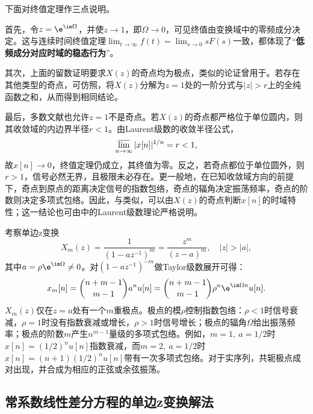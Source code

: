 下面对终值定理作三点说明。

首先，令$z=\e^{\im\Omega}$，并使$z\to 1$，即$\Omega\to 0$，可见终值由变换域中的零频成分决定。这与连续时间终值定理$\lim_{t\to\infty}f(t)=\lim_{s\to 0}sF(s)$一致，都体现了“\textbf{低频成分对应时域的稳态行为}”。

其次，上面的留数证明要求$X(z)$的奇点均为极点，类似的论证曾用于。若存在其他类型的奇点，可仿照，将$X(z)$分解为$z=1$处的一阶分式与$|z|>r$上的全纯函数之和，从而得到相同结论。

最后，多数文献也允许$z=1$不是奇点。若$X(z)$的奇点都严格位于单位圆内，则其收敛域的内边界半径$r<1$。由Laurent级数的收敛半径公式，
\begin{equation}
    \varlimsup_{n\to\infty}|x[n]|^{1/n}=r<1,
\end{equation}
故$x[n]\to 0$，终值定理仍成立，其终值为零。反之，若奇点都位于单位圆外，则$r>1$，信号必然无界，且极限未必存在。更一般地，在已知收敛域方向的前提下，奇点到原点的距离决定信号的指数包络，奇点的辐角决定振荡频率，奇点的阶数则决定多项式包络。因此，与类似，可以由$X(z)$的奇点判断$x[n]$的时域特性；这一结论也可由中的Laurent级数理论严格说明。

\begin{example}
    考察单边z变换
    \begin{equation}
        X_m(z)=\frac{1}{(1-az^{-1})^m}=\frac{z^m}{(z-a)^m},\quad |z|>|a|,
    \end{equation}
    其中$a=\rho\e^{\im\Omega}\neq 0$。对$(1-az^{-1})^{-m}$做Taylor级数展开可得：
    \begin{equation}
        x_m[n]=\binom{n+m-1}{m-1}a^n u[n]=\binom{n+m-1}{m-1}\rho^n\e^{\im\Omega n}u[n].
    \end{equation}
    $X_m(z)$仅在$z=a$处有一个$m$重极点。极点的模$\rho$控制指数包络：$\rho<1$时信号衰减，$\rho=1$时没有指数衰减或增长，$\rho>1$时信号增长；极点的辐角$\Omega$给出振荡频率；极点的阶数$m$产生$n^{m-1}$量级的多项式包络。例如，$m=1,\ a=1/2$时$x[n]=(1/2)^n u[n]$指数衰减，而$m=2,\ a=1/2$时$x[n]=(n+1)(1/2)^n u[n]$带有一次多项式包络。对于实序列，共轭极点成对出现，并合成为相应的正弦或余弦振荡。
\end{example}

\subsection{常系数线性差分方程的单边z变换解法}\label{sub:z_difference_equation}

